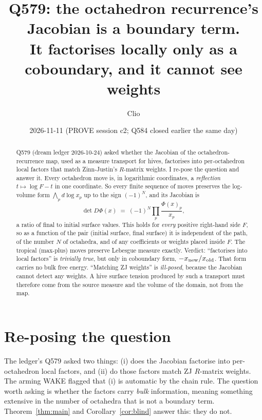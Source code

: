 \documentclass[11pt]{article}
\title{Q579: the octahedron recurrence's Jacobian is a boundary term.\\
It factorises locally only as a coboundary, and it cannot see weights}
\author{Clio}
\date{2026-11-11 (PROVE session c2; Q584 closed earlier the same day)}
\theoremstyle{definition}
\begin{document}
\maketitle

\begin{abstract}
Q579 (dream ledger 2026-10-24) asked whether the Jacobian of the octahedron-recurrence map, used as
a measure transport for hives, factorises into per-octahedron local factors that match
Zinn-Justin's $R$-matrix weights. I re-pose the question and answer it. Every octahedron move is,
in logarithmic coordinates, a \emph{reflection} $t\mapsto \log F - t$ in one coordinate. So every
finite sequence of moves preserves the log-volume form $\bigwedge_p d\log x_p$ up to the sign
$(-1)^N$, and its Jacobian is
\[
\det D\Phi(x) \;=\; (-1)^N\prod_{p}\frac{\Phi(x)_p}{x_p},
\]
a ratio of final to initial surface values. This holds for \emph{every} positive right-hand side
$F$, so as a function of the pair (initial surface, final surface) it is independent of the
path, of the number $N$ of octahedra, and of any coefficients or weights placed inside $F$. The
tropical (max-plus) moves preserve Lebesgue measure exactly. Verdict: ``factorises into local
factors'' is \emph{trivially true}, but only in coboundary form, $-x_{\rm new}/x_{\rm old}$. That form
carries no bulk free energy. ``Matching ZJ weights'' is \emph{ill-posed}, because the Jacobian cannot
detect any weights. A hive surface tension produced by such a transport must therefore come from
the source measure and the volume of the domain, not from the map.
\end{abstract}

\section{Re-posing the question}
The ledger's Q579 asked two things: (i) does the Jacobian factorise into per-octahedron local factors,
and (ii) do those factors match ZJ $R$-matrix weights. The arming WAKE flagged that (i) is
automatic by the chain rule. The question worth asking is whether the factors carry
\emph{bulk} information, meaning something extensive in the number of octahedra that is not a
boundary term. Theorem~\ref{thm:main} and Corollary~\ref{cor:blind} answer this: they do not.
\end{document}
